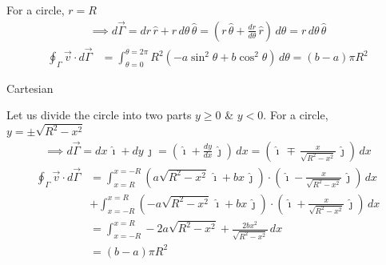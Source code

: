 \documentclass[../main.tex]{subfiles}
\begin{document}
\begin{questions}
\begin{parts}
\begin{subparts}
\begin{solution}
\begin{center}
			\end{center}
			For a circle, $r = R$
			\begin{align}
				\implies d\vec{\Gamma} = dr\,\hat{r} + r\,d\theta\,\hat{\theta} =  \left(r\,\hat{\theta} + \frac{dr}{d\theta}\,\hat{r}\right)\,d\theta = r\,d\theta\,\hat{\theta}
			\end{align}
			\begin{align}
				\oint_\Gamma \vec{v}\cdot d\vec{\Gamma} &= \int^{\theta=2\pi}_{\theta=0} R^2(-a\sin^2\theta + b\cos^2\theta)\,d\theta = (b-a)\pi R^2
			\end{align}
		\end{solution}
		\subpart Cartesian
		\begin{solution}
			\begin{center}
			\end{center}
			Let us divide the circle into two parts $y\geq0$ \& $y<0$. For a circle, $y = \pm\sqrt{R^2-x^2}$
			\begin{align}
				\implies d\vec{\Gamma} = dx\,\hat{\imath} + dy\,\hat{\jmath} =  \left(\hat{\imath} + \frac{dy}{dx}\,\hat{\jmath}\right)\,dx = \left(\hat{\imath}\,\mp\,\frac{x}{\sqrt{R^2-x^2}}\,\hat{\jmath}\right)\,dx 
			\end{align}
			\begin{align}
				\oint_{\Gamma} \vec{v}\cdot d\vec{\Gamma} &= \int^{x=-R}_{x=R} (a\sqrt{R^2-x^2}\,\hat{\imath} + bx\,\hat{\jmath})\cdot(\hat{\imath} - \frac{x}{\sqrt{R^2-x^2}}\,\hat{\jmath})\,dx \\
				&+ \int^{x=R}_{x=-R} (-a\sqrt{R^2-x^2}\,\hat{\imath} + bx\,\hat{\jmath})\cdot(\hat{\imath} + \frac{x}{\sqrt{R^2-x^2}}\,\hat{\jmath})\,dx \\
				&= \int^{x=R}_{x=-R} -2a\sqrt{R^2-x^2} + \frac{2bx^2}{\sqrt{R^2-x^2}}\,dx \\
				&= (b-a)\pi R^2
			\end{align}
		\end{solution}
	\end{subparts}


\end{parts}
\end{questions}
\end{document}
